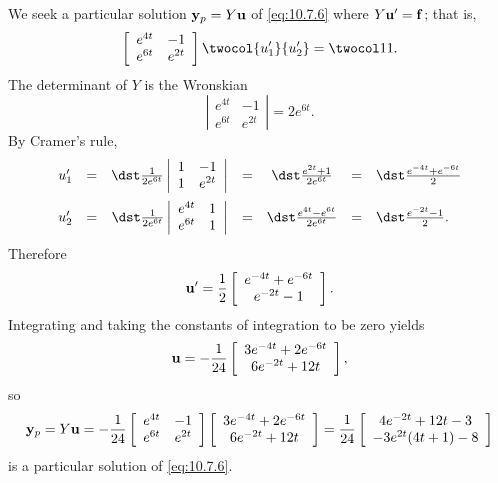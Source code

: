 \begin{examplesolution}
\solution We seek a particular solution ${\bf y}_{p}=Y{\bf u}$ of \eqref{eq:10.7.6} where
$Y{\bf u}'={\bf f}$; that is,
\[
  \left[
  \begin{array}{cc}
    e^{4t} & -1     \\
    e^{6t} & e^{2t}
  \end{array}\right] \twocol{u_{1}'}{u_{2}'}=\twocol11.
\]
The determinant of $Y$ is the Wronskian
\[
  \left|
  \begin{array}{cc}
    e^{4t} & -1     \\
    e^{6t} & e^{2t}
  \end{array}\right|=2e^{6t}.
\]
By Cramer's rule,
\[
  \begin{array}{cccccll}
    u_{1}' & = & \dst\frac{1}{2e^{6t}}\left|\begin{array}{cc}1&-1\\1&e^{2t}\end{array}\right|     & = & \dst\frac{e^{2t}+1}{2e^{6t}}      & = & \dst\frac{e^{-4t}+e^{-6t}}{2} \\[4\jot]
    u_{2}' & = & \dst\frac{1}{2e^{6t}}\left|\begin{array}{cc}e^{4t}&1\\e^{6t}&1\end{array}\right| & = & \dst\frac{e^{4t}-e^{6t}}{2e^{6t}} & = & \dst\frac{e^{-2t}-1}{2}.
  \end{array}
\]
Therefore
\[
  {\bf u}'=\frac{1}{2}\left[
  \begin{array}{c}
    e^{-4t}+e^{-6t} \\
    e^{-2t}-1
  \end{array}\right].
\]
Integrating and taking the constants of integration to be zero yields
\[
  {\bf u}=-\frac{1}{24}\left[
  \begin{array}{c}
    3e^{-4t}+2e^{-6t} \\
    6e^{-2t}+12t
  \end{array}\right],
\]
so
\[
  {\bf y}_{p}=Y{\bf u}= -\displaystyle\frac{1}{24}\left[
  \begin{array}{cc}
    e^{4t} & -1     \\
    e^{6t} & e^{2t}
  \end{array}\right] \left[
  \begin{array}{c}
    3e^{-4t}+2e^{-6t} \\
    6e^{-2t}+12t
  \end{array}\right] =\displaystyle\frac{1}{24}\left[
  \begin{array}{c}
    4e^{-2t}+12t-3   \\
    -3e^{2t}(4t+1)-8
  \end{array}\right]
\]
is a particular solution of \eqref{eq:10.7.6}.
\end{examplesolution}

